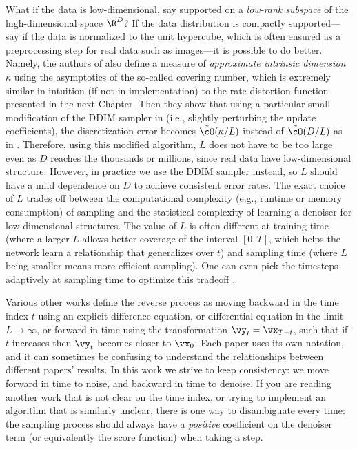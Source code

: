 \documentclass[../../book-main.tex]{subfiles}
\begin{document}
\begin{remark}
    What if the data is low-dimensional, say supported on a
    \textit{low-rank subspace} of the high-dimensional space
    \(\R^{D}\)? If the data distribution is compactly supported---say
    if the data is normalized to the unit hypercube, which is often
    ensured as a preprocessing step for real data such as
    images---it is possible to do better. Namely, the authors of
    \cite{li2024d} also define a measure of \textit{approximate
    intrinsic dimension} \(\kappa\) using the asymptotics of the so-called
    covering number, which is extremely similar in intuition (if not
    in implementation) to the rate-distortion function presented in
    the next Chapter. Then they show that using a particular small
    modification of the DDIM sampler in
     (i.e., slightly perturbing the
    update coefficients), the discretization error becomes
    \(\tilde{\cO}(\kappa/L)\) instead of \(\tilde{\cO}(D/L)\) as in
    . Therefore, using this
    modified algorithm, \(L\) does not have to be too large even as
    \(D\) reaches the thousands or millions, since real data have
    low-dimensional structure. However, in practice we use the DDIM
    sampler instead, so \(L\) should have a mild dependence on \(D\)
    to achieve consistent error rates. The exact choice of \(L\)
    trades off between the computational complexity (e.g., runtime or
    memory consumption) of sampling and the statistical complexity of
    learning a denoiser for low-dimensional structures. The value of
    \(L\) is often different at training time (where a larger \(L\)
        allows better coverage of the interval \([0, T]\), which helps
    the network learn a relationship that generalizes over \(t\))
    and sampling time (where \(L\) being smaller means more efficient
    sampling). One can even pick the timesteps adaptively at sampling
    time to optimize this tradeoff \cite{bao2022analytic}.
\end{remark}

\begin{remark}
    Various other works define the reverse process as moving backward
    in the time index \(t\) using an explicit difference equation, or
    differential equation in the limit \(L \to \infty\), or forward
    in time using the transformation \(\vy_{t} = \vx_{T - t}\), such
    that if \(t\) increases then \(\vy_{t}\) becomes closer to
    \(\vx_{0}\). Each paper uses its own notation, and it can
    sometimes be confusing to understand the relationships between
    different papers' results. In this work we strive to keep
    consistency: we move forward in time to noise, and backward in
    time to denoise. If you are reading another work that is not
    clear on the time index, or trying to implement an algorithm
    that is similarly unclear, there is one way to disambiguate
    every time: the sampling process should always have a
    \textit{positive} coefficient on the denoiser term (or
    equivalently the score function) when taking a step.
\end{remark}
\end{document}
